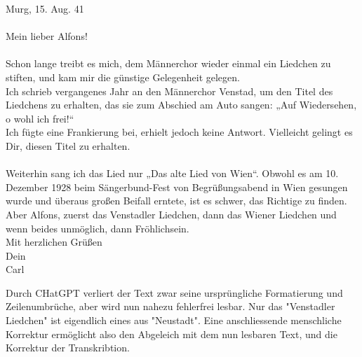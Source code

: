 \documentclass[12pt, a4paper, ngerman, bidi=default]{article}
\begin{document}
    \begin{tcolorbox}[colback=oldLetter, colframe=black, sharp corners, width=\textwidth]
    Murg, 15. Aug. 41\\
    \\
Mein lieber Alfons!\\
\\
Schon lange treibt es mich, dem Männerchor wieder einmal ein Liedchen zu stiften, und kam mir die günstige Gelegenheit gelegen.\\
Ich schrieb vergangenes Jahr an den Männerchor Venstad, um den Titel des Liedchens zu erhalten, das sie zum Abschied am Auto sangen: „Auf Wiedersehen, o wohl ich frei!“\\
Ich fügte eine Frankierung bei, erhielt jedoch keine Antwort. Vielleicht gelingt es Dir, diesen Titel zu erhalten.\\
\\
Weiterhin sang ich das Lied nur „Das alte Lied von Wien“. Obwohl es am 10. Dezember 1928 beim Sängerbund-Fest von Begrüßungsabend in Wien gesungen wurde und überaus großen Beifall erntete, ist es schwer, das Richtige zu finden.\\

Aber Alfons, zuerst das Venstadler Liedchen, dann das Wiener Liedchen und wenn beides unmöglich, dann Fröhlichsein.\\

Mit herzlichen Grüßen\\
Dein\\
Carl\\
\end{tcolorbox}

Durch CHatGPT verliert der Text zwar seine ursprüngliche Formatierung und Zeilenumbrüche, aber wird nun nahezu fehlerfrei lesbar. Nur das "Venstadler Liedchen" ist eigendlich eines aus "Neustadt". Eine anschliessende menschliche Korrektur ermöglicht also den Abgeleich mit dem nun lesbaren Text, und die Korrektur der Transkribtion.
\end{document}
